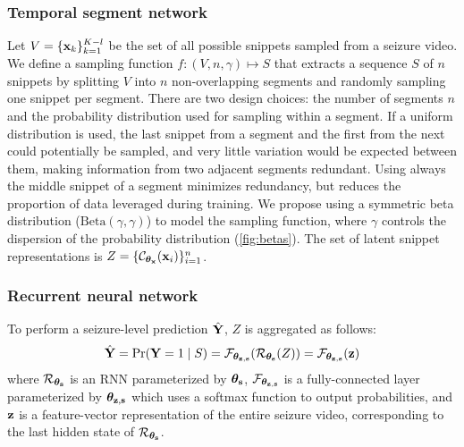 \subsubsection{Temporal segment network}
Let $V = \{ \mathbf{x}_k \}_{k=1}^{K-l}$ be the set of all possible snippets sampled from a seizure video.
We define a sampling function $f : (V, n, \gamma) \mapsto S$ that extracts a sequence $S$ of $n$ snippets by splitting $V$ into $n$ non-overlapping segments and randomly sampling one snippet per segment.
There are two design choices: the number of segments $n$ and the probability distribution used for sampling within a segment.
If a uniform distribution is used, the last snippet from a segment and the first from the next could potentially be sampled, and very little variation would be expected between them, making information from two adjacent segments redundant.
Using always the middle snippet of a segment minimizes redundancy, but reduces the proportion of data leveraged during training.
We propose using a symmetric beta distribution ($\text{Beta}(\gamma, \gamma)$) to model the sampling function, where $\gamma$ controls the dispersion of the probability distribution (\cref{fig:betas}).
The set of latent snippet representations is $Z = \{ \mathcal{C}_{\bm{\theta}_{\mathbf{x}}} (\mathbf{x}_i) \}_{i = 1}^{n}$.


\subsubsection{Recurrent neural network}

To perform a seizure-level prediction $\hat{\mathbf{Y}}$, $Z$ is aggregated as follows:
\begin{equation}
    \hat{\mathbf{Y}}
    = \Pr(\mathbf{Y} = 1 \mid S)
    = \mathcal{F}_{\bm{\theta}_{\mathbf{z},\mathbf{s}}}( \mathcal{R}_{\bm{\theta}_{\mathbf{s}}} ( Z ) )
    = \mathcal{F}_{\bm{\theta}_{\mathbf{z},\mathbf{s}}}( \mathbf{z} )
\end{equation}
where
$\mathcal{R}_{\bm{\theta}_{\mathbf{s}}}$ is an \ac{RNN} parameterized by $\bm{\theta}_{\mathbf{s}}$,
$\mathcal{F}_{\bm{\theta}_{\mathbf{z},\mathbf{s}}}$ is a fully-connected layer parameterized by $\bm{\theta}_{\mathbf{z},\mathbf{s}}$ which uses a softmax function to output probabilities,
and $\mathbf{z}$ is a feature-vector representation of the entire seizure video, corresponding to the last hidden state of $\mathcal{R}_{\bm{\theta}_{\mathbf{s}}}$.
